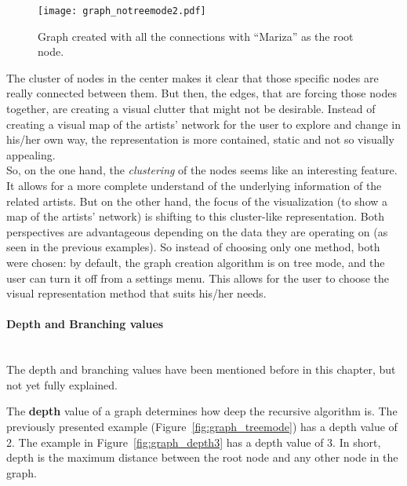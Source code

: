       \begin{figure}[tb]
        \begin{center}
          \texttt{[image: graph\_notreemode2.pdf]}
        \end{center}
        \caption{Graph created with all the connections with ``Mariza'' as the root node.}
        \label{fig:graph_notreemode2}
      \end{figure}

      The cluster of nodes in the center makes it clear that those specific nodes are really connected between them. 
      But then, the edges, that are forcing those nodes together, are creating a visual clutter that might not be desirable.
      Instead of creating a visual map of the artists' network for the user to  explore and change in his/her own way, the representation is more contained, static and not so visually appealing.
      \hfill \\

      So, on the one hand, the \emph{clustering} of the nodes seems like an interesting feature.
      It allows for a more complete understand of the underlying information of the related artists.
      But on the other hand, the focus of the visualization (to show a map of the artists' network) is shifting to this cluster-like representation.
      Both perspectives are advantageous depending on the data they are operating on (as seen in the previous examples).
      So instead of choosing only one method, both were chosen: by default, the graph creation algorithm is on tree mode, and the user can turn it off from a settings menu.
      This allows for the user to choose the visual representation method that suits his/her needs.

      \paragraph{Depth and Branching values} \hfill \\
      The depth and branching values have been mentioned before in this chapter, but not yet fully explained.

      The \textbf{depth} value of a graph determines how deep the recursive algorithm is.
      The previously presented example (Figure~\ref{fig:graph_treemode}) has a depth value of 2.
      The example in Figure~\ref{fig:graph_depth3} has a depth value of 3.
      In short, depth is the maximum distance between the root node and any other node in the graph.

